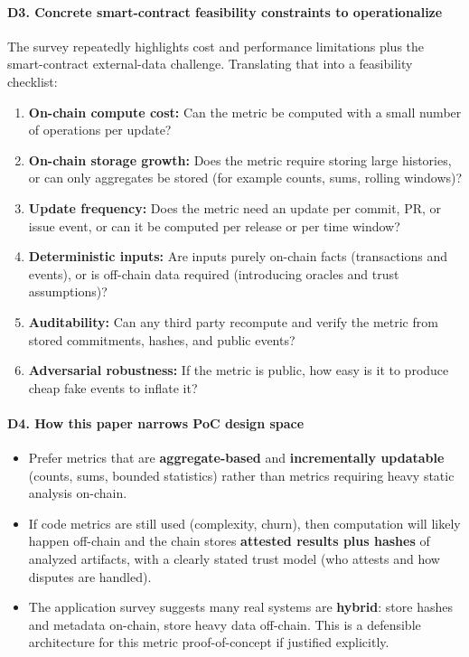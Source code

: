 \documentclass[11pt,a4paper]{article}
\begin{document}
\paragraph{D3. Concrete smart-contract feasibility constraints to operationalize}
The survey repeatedly highlights cost and performance limitations plus the smart-contract external-data challenge. Translating that into a feasibility checklist:
\begin{enumerate}[leftmargin=*]
  \item \textbf{On-chain compute cost:} Can the metric be computed with a small number of operations per update?
  \item \textbf{On-chain storage growth:} Does the metric require storing large histories, or can only aggregates be stored (for example counts, sums, rolling windows)?
  \item \textbf{Update frequency:} Does the metric need an update per commit, PR, or issue event, or can it be computed per release or per time window?
  \item \textbf{Deterministic inputs:} Are inputs purely on-chain facts (transactions and events), or is off-chain data required (introducing oracles and trust assumptions)?
  \item \textbf{Auditability:} Can any third party recompute and verify the metric from stored commitments, hashes, and public events?
  \item \textbf{Adversarial robustness:} If the metric is public, how easy is it to produce cheap fake events to inflate it?
\end{enumerate}

\paragraph{D4. How this paper narrows PoC design space}
\begin{itemize}[leftmargin=*]
  \item Prefer metrics that are \textbf{aggregate-based} and \textbf{incrementally updatable} (counts, sums, bounded statistics) rather than metrics requiring heavy static analysis on-chain.
  \item If code metrics are still used (complexity, churn), then computation will likely happen off-chain and the chain stores \textbf{attested results plus hashes} of analyzed artifacts, with a clearly stated trust model (who attests and how disputes are handled).
  \item The application survey suggests many real systems are \textbf{hybrid}: store hashes and metadata on-chain, store heavy data off-chain. This is a defensible architecture for this metric proof-of-concept if justified explicitly.
\end{itemize}
\end{document}
